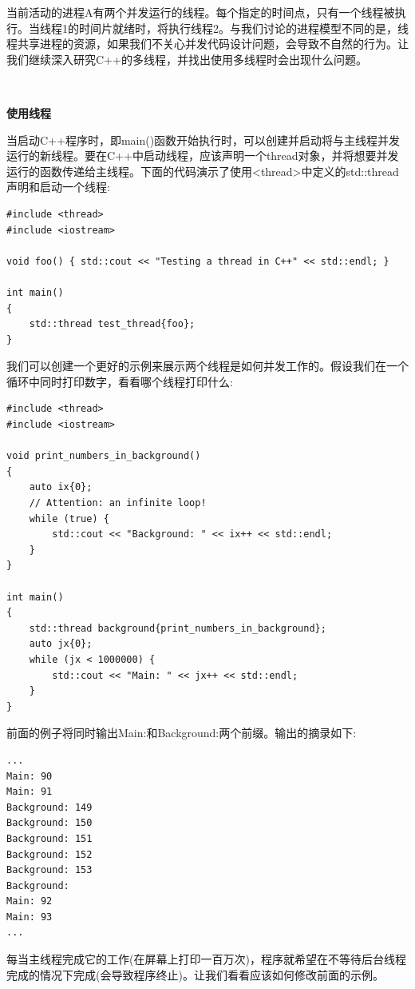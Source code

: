 当前活动的进程A有两个并发运行的线程。每个指定的时间点，只有一个线程被执行。当线程1的时间片就绪时，将执行线程2。与我们讨论的进程模型不同的是，线程共享进程的资源，如果我们不关心并发代码设计问题，会导致不自然的行为。让我们继续深入研究C++的多线程，并找出使用多线程时会出现什么问题。 \par

\noindent\textbf{}\ \par
\textbf{使用线程} \ \par
当启动C++程序时，即main()函数开始执行时，可以创建并启动将与主线程并发运行的新线程。要在C++中启动线程，应该声明一个thread对象，并将想要并发运行的函数传递给主线程。下面的代码演示了使用<thread>中定义的std::thread声明和启动一个线程: \par

\begin{lstlisting}[caption={}]
#include <thread>
#include <iostream>

void foo() { std::cout << "Testing a thread in C++" << std::endl; }

int main()
{
	std::thread test_thread{foo};
}
\end{lstlisting}

我们可以创建一个更好的示例来展示两个线程是如何并发工作的。假设我们在一个循环中同时打印数字，看看哪个线程打印什么: \par

\begin{lstlisting}[caption={}]
#include <thread>
#include <iostream>

void print_numbers_in_background()
{
	auto ix{0};
	// Attention: an infinite loop!
	while (true) {
		std::cout << "Background: " << ix++ << std::endl;
	}
}

int main()
{
	std::thread background{print_numbers_in_background};
	auto jx{0};
	while (jx < 1000000) {
		std::cout << "Main: " << jx++ << std::endl;
	}
}
\end{lstlisting}

前面的例子将同时输出Main:和Background:两个前缀。输出的摘录如下: \par

\begin{lstlisting}[caption={}]
...
Main: 90
Main: 91
Background: 149
Background: 150
Background: 151
Background: 152
Background: 153
Background:
Main: 92
Main: 93
...
\end{lstlisting}

每当主线程完成它的工作(在屏幕上打印一百万次)，程序就希望在不等待后台线程完成的情况下完成(会导致程序终止)。让我们看看应该如何修改前面的示例。 \par

